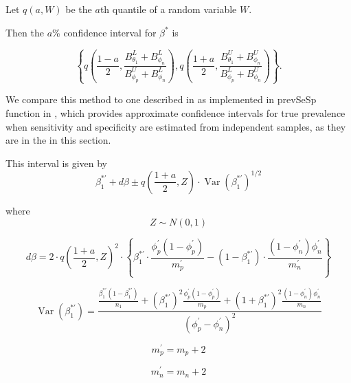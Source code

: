\documentclass[AMA,STIX1COL]{WileyNJD-v2}
\DeclareMathOperator{\Var}{Var}
\begin{document}
Let \( q(a, W) \) be the \( a \)th quantile of a random variable \( W \).

Then the \( a \)\% confidence interval for \( \beta^* \) is 

\begin{equation}
    \left\{ q \left( \frac{1 - a}{2}, \frac{B_{\theta_1}^L + B_{\phi_n}^L }{B_{\phi_p}^U + B_{\phi_n}^L }  \right),  q \left( \frac{1 + a}{2}, \frac{B_{\theta_1}^U + B_{\phi_n}^U}{B_{\phi_p}^L + B_{\phi_n}^U}  \right) \right\}.
\label{eq:srs-conf-int}
\end{equation}

We compare this method to one described in \cite{Lang:2014} as implemented in prevSeSp function in \cite{asht}, which provides approximate confidence intervals for true prevalence when sensitivity and specificity are estimated from independent samples, as they are in the in this section.

This interval is given by
\begin{equation}
\beta_1^{*\prime} + d\beta \pm q\left( \frac{1 + a}{2}, Z \right) \cdot \Var(\beta_1^{*\prime})^{1/2}    
\end{equation}

where
\begin{equation}
   Z \sim N(0,1) 
\end{equation}

\begin{equation}
    d\beta = 2 \cdot q\left( \frac{1 + a}{2}, Z \right)^2 \cdot\left\{ \beta_1^{*\prime} \cdot \frac{\phi_p^\prime (1 - \phi_p^\prime)}{m_p^\prime} - (1 - \beta_1^{*\prime}) \cdot \frac{(1 - \phi_n^\prime) \phi_n^\prime}{m_n^\prime}  \right\}
\end{equation}

\begin{equation}
    \Var(\beta_1^{*\prime}) = \frac{ \frac{\beta_1^{*\prime}(1 - \beta_1^{*\prime})}{n_1} + \left(\beta_1^{*\prime}\right)^2 \frac{\phi_p^\prime (1 - \phi_p^\prime)}{m_p} + \left(1 + \beta_1^{*\prime}\right)^2 \frac{(1 - \phi_n^\prime) \phi_n^\prime}{ m_n}}{(\phi_p^\prime - \phi_n^\prime)^2}
\end{equation}

\begin{equation}
    m_p^\prime = m_p +2
\end{equation}

\begin{equation}
    m_n^\prime = m_n + 2
\end{equation}
\end{document}
